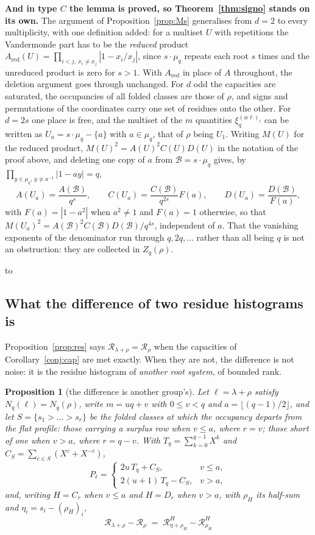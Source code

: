 \documentclass[11pt,a4paper]{article}
\newtheorem{proposition}[theorem]{Proposition}
\theoremstyle{definition}
\newenvironment{keybox}
  {\par\vspace{9pt}\begin{lrbox}{\fichabox}%
   \begin{minipage}{0.90\textwidth}\vspace{7pt}\setlength{\parskip}{3pt}}
  {\vspace{7pt}\end{minipage}\end{lrbox}%
   \par\noindent\hbox to \textwidth{\hfill
   \textcolor{azul}{\rule[-\dp\fichabox]{3.2pt}{\dimexpr\ht\fichabox+\dp\fichabox\relax}}%
   \colorbox{fondoficha}{\usebox{\fichabox}}\hfill}%
   \par\vspace{9pt}}
\begin{document}
\begin{keybox}
\textbf{And in type $C$ the lemma is proved, so Theorem~\ref{thm:signo} stands on its own.} The
argument of Proposition~\ref{prop:Ms} generalises from $d=2$ to every multiplicity, with one
definition added: for a multiset $U$ with repetitions the Vandermonde part has to be the
\emph{reduced} product
$A_{\mathrm{red}}(U)=\prod_{i<j,\ x_i\neq x_j}|1-x_i/x_j|$, since $s\cdot\mu_q$ repeats each
root $s$ times and the unreduced product is zero for $s>1$. With $A_{\mathrm{red}}$ in place of $A$
throughout, the deletion argument goes through unchanged. For $d$ odd the
capacities are saturated, the occupancies of all folded classes are those of $\rho$, and signs and
permutations of the coordinates carry one set of residues onto the other. For $d=2s$ one place is
free, and the multiset of the $m$ quantities $\xi_q^{(w\ell)_i}$ can be written as
$U_a=s\cdot\mu_q-\{a\}$ with $a\in\mu_q$, that of $\rho$ being $U_1$. Writing $M(U)$ for the reduced
product, $M(U)^2=A(U)^2C(U)D(U)$ in the notation of the proof above, and deleting one copy of $a$
from $\mathcal B=s\cdot\mu_q$ gives, by $\prod_{y\in\mu_q,\,y\neq a^{-1}}|1-ay|=q$,
\[
A(U_a)=\frac{A(\mathcal B)}{q^{s}},\qquad
C(U_a)=\frac{C(\mathcal B)}{q^{2s}}F(a),\qquad
D(U_a)=\frac{D(\mathcal B)}{F(a)},
\]
with $F(a)=|1-a^2|$ when $a^2\neq1$ and $F(a)=1$ otherwise, so that
$M(U_a)^2=A(\mathcal B)^2C(\mathcal B)D(\mathcal B)/q^{4s}$, independent of $a$. That the vanishing
exponents of the denominator run through $q,2q,\dots$ rather than all being $q$ is not an
obstruction: they are collected in $Z_q(\rho)$.
\end{keybox}

\subsection*{What the difference of two residue histograms is}

\noindent Proposition~\ref{prop:res} says $\mathscr{R}_{\lambda+\rho}=\mathscr{R}_\rho$ when the
capacities of Corollary~\ref{conj:cap} are met exactly. When they are not, the difference is not
noise: it is the residue histogram of \emph{another root system}, of bounded rank.

\begin{proposition}[the difference is another group's]\label{prop:resid}
Let $\ell=\lambda+\rho$ satisfy $N_q(\ell)=N_q(\rho)$, write $m=uq+v$ with $0\le v<q$ and
$a=\lfloor(q-1)/2\rfloor$, and let $S=\{s_1>\dots>s_r\}$ be the folded classes at which the
occupancy departs from the flat profile: those carrying a surplus row when $v\le a$, where $r=v$;
those short of one when $v>a$, where $r=q-v$. With $T_q=\sum_{k=0}^{q-1}X^k$ and
$C_S=\sum_{c\in S}(X^c+X^{-c})$,
\[
P_\ell=\begin{cases}2u\,T_q+C_S, & v\le a,\\[1mm] 2(u+1)\,T_q-C_S, & v>a,\end{cases}
\]
and, writing $H=C_r$ when $v\le a$ and $H=D_r$ when $v>a$, with $\rho_H$ its half-sum and
$\eta_i=s_i-(\rho_H)_i$,
\[
\boxed{\;\mathscr{R}_{\lambda+\rho}-\mathscr{R}_{\rho}
\;=\;\mathscr{R}^{H}_{\eta+\rho_H}-\mathscr{R}^{H}_{\rho_H}\;}
\]
\end{proposition}
\end{document}
